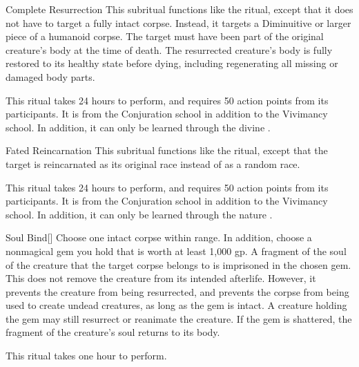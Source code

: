 \begin{ability}[\nth{5}]{Complete Resurrection}
This subritual functions like the  ritual, except that it does not have to target a fully intact corpse.
Instead, it targets a Diminuitive or larger piece of a humanoid corpse.
The target must have been part of the original creature's body at the time of death.
The resurrected creature's body is fully restored to its healthy state before dying, including regenerating all missing or damaged body parts.

This ritual takes 24 hours to perform, and requires 50 action points from its participants.
It is from the Conjuration school in addition to the Vivimancy school.
In addition, it can only be learned through the divine .
\end{ability}
\vspace{0.25em}



\begin{ability}[\nth{5}]{Fated Reincarnation}
This subritual functions like the  ritual, except that the target is reincarnated as its original race instead of as a random race.

This ritual takes 24 hours to perform, and requires 50 action points from its participants.
It is from the Conjuration school in addition to the Vivimancy school.
In addition, it can only be learned through the nature .
\end{ability}
\vspace{0.25em}



\begin{ability}[\nth{5}]{Soul Bind}[]
Choose one intact corpse within \rngclose range.
In addition, choose a nonmagical gem you hold that is worth at least 1,000 gp.
A fragment of the soul of the creature that the target corpse belongs to is imprisoned in the chosen gem.
This does not remove the creature from its intended afterlife.
However, it prevents the creature from being resurrected, and prevents the corpse from being used to create undead creatures, as long as the gem is intact.
A creature holding the gem may still resurrect or reanimate the creature.
If the gem is shattered, the fragment of the creature's soul returns to its body.

This ritual takes one hour to perform.
\end{ability}
\vspace{0.25em}



